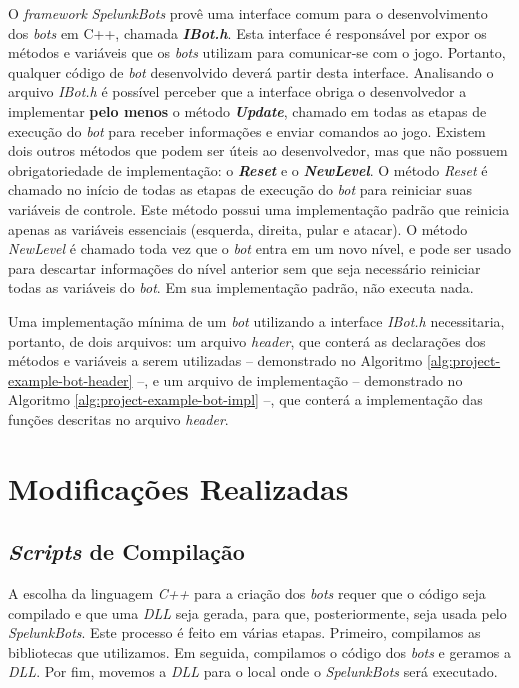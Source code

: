 O \textit{framework} \textit{SpelunkBots} provê uma interface comum para o
desenvolvimento dos \textit{bots} em C++, chamada \textbf{\textit{IBot.h}}. Esta
interface é responsável por expor os métodos e variáveis que os \textit{bots}
utilizam para comunicar-se com o jogo. Portanto, qualquer código de \textit{bot}
desenvolvido deverá partir desta interface. Analisando o arquivo \textit{IBot.h}
é possível perceber que a interface obriga o desenvolvedor a implementar
\textbf{pelo menos} o método \textbf{\textit{Update}}, chamado em todas as
etapas de execução do \textit{bot} para receber informações e enviar comandos ao
jogo. Existem dois outros métodos que podem ser úteis ao desenvolvedor, mas que
não possuem obrigatoriedade de implementação: o \textbf{\textit{Reset}} e o
\textbf{\textit{NewLevel}}. O método \textit{Reset} é chamado no início de todas
as etapas de execução do \textit{bot} para reiniciar suas variáveis de controle.
Este método possui uma implementação padrão que reinicia apenas as variáveis
essenciais (esquerda, direita, pular e atacar). O método \textit{NewLevel} é
chamado toda vez que o \textit{bot} entra em um novo nível, e pode ser usado
para descartar informações do nível anterior sem que seja necessário reiniciar
todas as variáveis do \textit{bot}. Em sua implementação padrão, não executa
nada.

Uma implementação mínima de um \textit{bot} utilizando a interface
\textit{IBot.h} necessitaria, portanto, de dois arquivos: um arquivo
\textit{header}, que conterá as declarações dos métodos e variáveis a serem
utilizadas -- demonstrado no Algoritmo \ref{alg:project-example-bot-header} --,
e um arquivo de implementação -- demonstrado no Algoritmo
\ref{alg:project-example-bot-impl} --, que conterá a implementação das funções
descritas no arquivo \textit{header}.

\section{\label{section:modifications}Modificações Realizadas}

\subsection{\textit{Scripts} de Compilação}

A escolha da linguagem \textit{C++} para a criação dos \textit{bots} requer que
o código seja compilado e que uma \textit{DLL} seja gerada, para que,
posteriormente, seja usada pelo \textit{SpelunkBots}. Este processo é feito em
várias etapas.  Primeiro, compilamos as bibliotecas que utilizamos. Em seguida,
compilamos o código dos \textit{bots} e geramos a \textit{DLL}. Por fim,
movemos a \textit{DLL} para o local onde o \textit{SpelunkBots} será executado.

